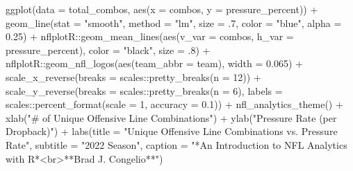 \documentclass[
  letterpaper,
]{krantz}
\newenvironment{Shaded}{\begin{snugshade}}{\end{snugshade}}
\newcommand{\AttributeTok}[1]{\textcolor[rgb]{0.40,0.45,0.13}{#1}}
\newcommand{\DecValTok}[1]{\textcolor[rgb]{0.68,0.00,0.00}{#1}}
\newcommand{\FloatTok}[1]{\textcolor[rgb]{0.68,0.00,0.00}{#1}}
\newcommand{\FunctionTok}[1]{\textcolor[rgb]{0.28,0.35,0.67}{#1}}
\newcommand{\NormalTok}[1]{\textcolor[rgb]{0.00,0.23,0.31}{#1}}
\newcommand{\SpecialCharTok}[1]{\textcolor[rgb]{0.37,0.37,0.37}{#1}}
\newcommand{\StringTok}[1]{\textcolor[rgb]{0.13,0.47,0.30}{#1}}
\begin{document}
\begin{Shaded}
\begin{Highlighting}[]
\FunctionTok{ggplot}\NormalTok{(}\AttributeTok{data =}\NormalTok{ total\_combos, }\FunctionTok{aes}\NormalTok{(}\AttributeTok{x =}\NormalTok{ combos, }\AttributeTok{y =}\NormalTok{ pressure\_percent)) }\SpecialCharTok{+}
  \FunctionTok{geom\_line}\NormalTok{(}\AttributeTok{stat =} \StringTok{"smooth"}\NormalTok{, }\AttributeTok{method =} \StringTok{"lm"}\NormalTok{,}
            \AttributeTok{size =}\NormalTok{ .}\DecValTok{7}\NormalTok{, }\AttributeTok{color =} \StringTok{"blue"}\NormalTok{,}
            \AttributeTok{alpha =} \FloatTok{0.25}\NormalTok{) }\SpecialCharTok{+}
\NormalTok{  nflplotR}\SpecialCharTok{::}\FunctionTok{geom\_mean\_lines}\NormalTok{(}\FunctionTok{aes}\NormalTok{(}\AttributeTok{v\_var =}\NormalTok{ combos, }\AttributeTok{h\_var =}\NormalTok{ pressure\_percent),}
                            \AttributeTok{color =} \StringTok{"black"}\NormalTok{, }\AttributeTok{size =}\NormalTok{ .}\DecValTok{8}\NormalTok{) }\SpecialCharTok{+}
\NormalTok{  nflplotR}\SpecialCharTok{::}\FunctionTok{geom\_nfl\_logos}\NormalTok{(}\FunctionTok{aes}\NormalTok{(}\AttributeTok{team\_abbr =}\NormalTok{ team), }\AttributeTok{width =} \FloatTok{0.065}\NormalTok{) }\SpecialCharTok{+}
  \FunctionTok{scale\_x\_reverse}\NormalTok{(}\AttributeTok{breaks =}\NormalTok{ scales}\SpecialCharTok{::}\FunctionTok{pretty\_breaks}\NormalTok{(}\AttributeTok{n =} \DecValTok{12}\NormalTok{)) }\SpecialCharTok{+}
  \FunctionTok{scale\_y\_reverse}\NormalTok{(}\AttributeTok{breaks =}\NormalTok{ scales}\SpecialCharTok{::}\FunctionTok{pretty\_breaks}\NormalTok{(}\AttributeTok{n =} \DecValTok{6}\NormalTok{),}
                     \AttributeTok{labels =}\NormalTok{ scales}\SpecialCharTok{::}\FunctionTok{percent\_format}\NormalTok{(}\AttributeTok{scale =} \DecValTok{1}\NormalTok{,}
                                                     \AttributeTok{accuracy =} \FloatTok{0.1}\NormalTok{)) }\SpecialCharTok{+}
  \FunctionTok{nfl\_analytics\_theme}\NormalTok{() }\SpecialCharTok{+}
  \FunctionTok{xlab}\NormalTok{(}\StringTok{"\# of Unique Offensive Line Combinations"}\NormalTok{) }\SpecialCharTok{+}
  \FunctionTok{ylab}\NormalTok{(}\StringTok{"Pressure Rate (per Dropback)"}\NormalTok{) }\SpecialCharTok{+}
  \FunctionTok{labs}\NormalTok{(}\AttributeTok{title =} \StringTok{"Unique Offensive Line Combinations vs. Pressure Rate"}\NormalTok{,}
       \AttributeTok{subtitle =} \StringTok{"2022 Season"}\NormalTok{,}
       \AttributeTok{caption =} \StringTok{"*An Introduction to NFL Analytics with R*\textless{}br\textgreater{}**Brad J. Congelio**"}\NormalTok{)}
\end{Highlighting}
\end{Shaded}
\end{document}
